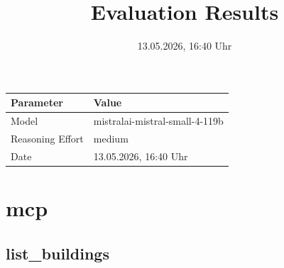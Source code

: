\documentclass[a4paper,11pt]{article}
\title{Evaluation Results}
\date{13.05.2026, 16:40 Uhr}
\begin{document}
\maketitle

\begin{table}[H]
\centering
\begin{tabular}{l l}
\toprule
\textbf{Parameter} & \textbf{Value} \\
\midrule
Model & mistralai-mistral-small-4-119b \\
Reasoning Effort & medium \\
Date & 13.05.2026, 16:40 Uhr \\
\bottomrule
\end{tabular}
\end{table}

\tableofcontents
\clearpage

\section{mcp}

\subsection{list\_buildings}
\end{document}
